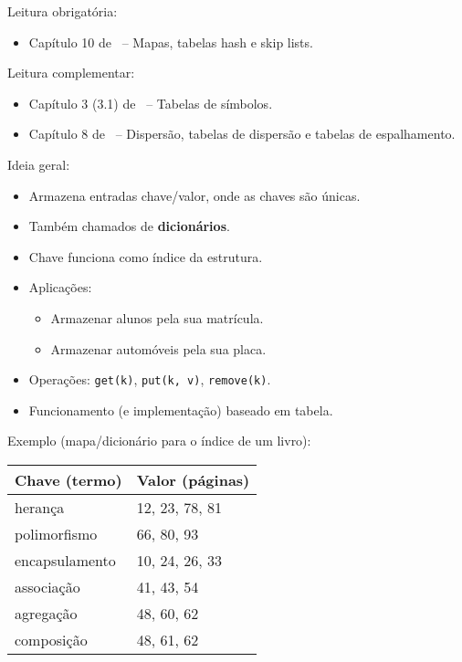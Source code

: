 \newcommand{\templatesdir}{../../../templates}
\newcommand{\template}{template-roteiro-est}


\newcommand{\content}{Mapas}
\newcommand{\class}{Algoritmos e Estruturas de Dados}
\newcommand{\shortcourse}{45EST}



\makeheader

{
Leitura obrigatória:
\begin{itemize}
	\item Capítulo 10 de~\cite{GoodrichEtAl2014} -- Mapas, tabelas hash e skip lists.
\end{itemize}

Leitura complementar:
\begin{itemize}
	\item Capítulo 3 (3.1) de~\cite{SedgewickAndWayne2011} -- Tabelas de símbolos.
	\item Capítulo 8 de~\cite{Preiss2001} -- Dispersão, tabelas de dispersão e tabelas de espalhamento.
\end{itemize}
}

\medskip


Ideia geral:
\begin{itemize}
	\item Armazena entradas chave/valor, onde as chaves são únicas.
	\item Também chamados de \textbf{dicionários}.
	\item Chave funciona como índice da estrutura.
	\item Aplicações:
	\begin{itemize}
		\item Armazenar alunos pela sua matrícula.
		\item Armazenar automóveis pela sua placa.
	\end{itemize}
	\item Operações: \texttt{get(k)}, \texttt{put(k,\,v)}, \texttt{remove(k)}.
	\item Funcionamento (e implementação) baseado em tabela.
\end{itemize}

\clearpage

Exemplo (mapa/dicionário para o índice de um livro):

\begin{table}[H]
	\centering
	\begin{tabular}{ll}
		\hline
		\textbf{Chave (termo)} & \textbf{Valor (páginas)} \\
		\hline
		herança & 12, 23, 78, 81 \\
		polimorfismo & 66, 80, 93 \\
		encapsulamento & 10, 24, 26, 33 \\
		associação & 41, 43, 54 \\
		agregação & 48, 60, 62 \\
		composição & 48, 61, 62 \\
		\hline
	\end{tabular}
\end{table}

